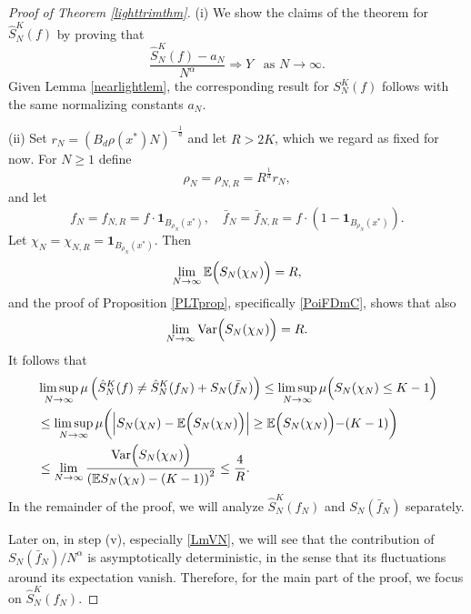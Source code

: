 \documentclass[11pt,twoside,a4paper,reqno]{amsart}
\newcommand{\Var}{\operatorname{Var}}
\newcommand{\as}[1]{\text{as } #1 \rightarrow\infty}
\newcommand{\E}{\mathbb{E}}
\def\one{{\mathbf{1}}}
\begin{document}
\begin{proof}[Proof of Theorem \ref{lighttrimthm}]
(i) We show the claims of the theorem for $\hat{S}_N^K(f)$ by proving that
\begin{equation}\label{hatSlightcon}
\frac{\hat{S}_N^K(f)-a_N}{N^{\alpha}} \Rightarrow Y \;\;\;\as{N}.
\end{equation}
Given Lemma \ref{nearlightlem}, the corresponding result for $S_N^K(f)$ follows with the same normalizing constants $a_N$.


(ii)
Set $r_N=(B_d \rho(x^*) N)^{-\frac{1}{d}}$ and let $R>2K$, which we regard as fixed for now. For $N \geq 1$ define
$$
\rho_N=\rho_{N,R}=R^{\frac{1}{d}} r_N,
$$
and let
$$
f_N=f_{N,R}= f \cdot \one_{B_{\rho_N}(x^*)}, \quad
\bar{f}_N=\bar{f}_{N,R} = f \cdot \left( 1 - \one_{B_{\rho_N}(x^*)} \right).
$$
Let $\chi_N = \chi_{N,R} = \one_{B_{\rho_N}(x^*)}$. Then
$$
\lim_{N\rightarrow \infty} \E\Bigl(S_N(\chi_N)\Bigr) = R,
$$
and the proof of Proposition \ref{PLTprop}, specifically \eqref{PoiFDmC}, shows that also
$$
\lim_{N\rightarrow \infty} \Var\Bigl(S_N(\chi_N)\Bigr)= R.
$$
It follows that
\begin{equation}\label{snksplit}
\begin{aligned}
&\limsup_{N\rightarrow \infty} \mu\left(\hat{S}_N^K(f) \neq \hat{S}_N^K(f_N) + S_N(\bar{f}_N) \right)
\leq \limsup_{N\rightarrow \infty} \mu\Bigl( S_N(\chi_N) \leq K-1 \Bigr)\\
&\leq \limsup_{N\rightarrow \infty}\mu\biggl(\left|S_N(\chi_N)-\E \Bigl(S_N(\chi_N)\Bigr)\right|\geq\E\Bigl(S_N(\chi_N)\Bigl)-(K-1)\biggr)\\
&\leq \lim_{N\rightarrow \infty}\frac{\Var\Bigl(S_N(\chi_N)\Bigr)}{\left(\E S_N(\chi_N)-(K-1)\right)^2} \leq \frac{4}{R}.
\end{aligned}
\end{equation}
In the remainder of the proof, we will analyze $\hat{S}_N^K(f_N)$ and $S_N(\bar{f}_N)$ separately.

Later on, in step (v), especially \eqref{LmVN}, we will see that the contribution of $S_N(\bar{f}_N)/N^\alpha$ is asymptotically deterministic, in the sense that its fluctuations around its expectation vanish. Therefore, for the main part of the proof, we focus on $\hat{S}_N^K(f_N)$.




\end{proof}
\end{document}
